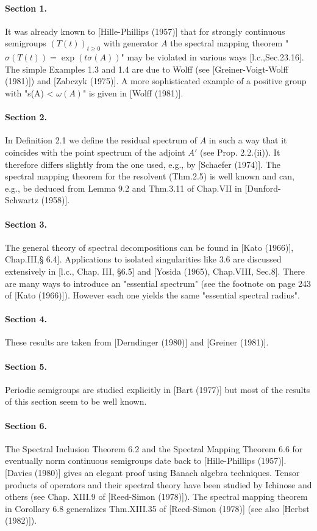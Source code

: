 \paragraph{Section 1.} It was already known to [Hille-Phillips (1957)] that for strongly continuous semigroups $(T(t))_{t\geq 0}$ with generator $A$ the spectral mapping theorem "$\sigma(T(t)) = \exp(t\sigma(A))$" may be violated in various ways [l.c.,Sec.23.16].
The simple Examples 1.3 and 1.4 are due to Wolff (see [Greiner-Voigt-Wolff (1981)]) and [Zabczyk (1975)].
A more sophisticated example of a positive group with "s(A) < $\omega(A)$" is given in [Wolff (1981)].

\paragraph{Section 2.} In Definition 2.1 we define the residual spectrum of $A$ in such a way that it coincides with the point spectrum of the adjoint $A'$ (see Prop. 2.2.(ii)).
It therefore differs slightly from the one used, e.g., by [Schaefer (1974)].
The spectral mapping theorem for the resolvent (Thm.2.5) is well known and can, e.g., be deduced from Lemma 9.2 and Thm.3.11 of Chap.VII in [Dunford-Schwartz (1958)].

\paragraph{Section 3.} The general theory of spectral decompositions can be found in [Kato (1966)], Chap.III,§ 6.4].
Applications to isolated singularities like 3.6 are discussed extensively in [l.c., Chap. III, §6.5] and [Yosida (1965), Chap.VIII, Sec.8].
There are many ways to introduce an "essential spectrum" (see the footnote on page 243 of [Kato (1966)]).
However each one yields the same "essential spectral radius".

\paragraph{Section 4.} These results are taken from [Derndinger (1980)] and [Greiner (1981)].

\paragraph{Section 5.} Periodic semigroups are studied explicitly in [Bart (1977)] but most of the results of this section seem to be well known.

\paragraph{Section 6.} The Spectral Inclusion Theorem 6.2 and the Spectral Mapping Theorem 6.6 for eventually norm continuous semigroups date back to [Hille-Phillips (1957)].
[Davies (1980)] gives an elegant proof using Banach algebra techniques.
Tensor products of operators and their spectral theory have been studied by Ichinose and others (see Chap. XIII.9 of [Reed-Simon (1978)]).
The spectral mapping theorem in Corollary 6.8 generalizes Thm.XIII.35 of [Reed-Simon (1978)] (see also [Herbst (1982)]).

